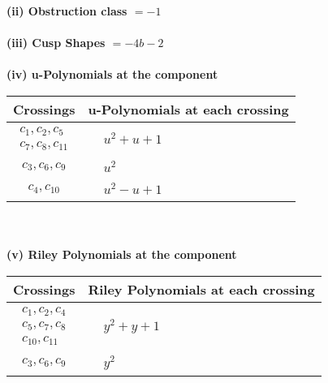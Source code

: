 \documentclass[1p]{elsarticle_modified}
\theoremstyle{definition}
\begin{document}
\flushleft \textbf{(ii) Obstruction class $= -1$}\\~\\
\flushleft \textbf{(iii) Cusp Shapes $= -4 b-2$}\\~\\
\newpage\renewcommand{\arraystretch}{1}
\flushleft \textbf{(iv) u-Polynomials at the component}\newline \\
\begin{tabular}{m{50pt}|m{274pt}}
Crossings & \hspace{64pt}u-Polynomials at each crossing \\
\hline $$\begin{aligned}c_{1},c_{2},c_{5}\\c_{7},c_{8},c_{11}\end{aligned}$$&$\begin{aligned}
&u^2+u+1
\end{aligned}$\\
\hline $$\begin{aligned}c_{3},c_{6},c_{9}\end{aligned}$$&$\begin{aligned}
&u^2
\end{aligned}$\\
\hline $$\begin{aligned}c_{4},c_{10}\end{aligned}$$&$\begin{aligned}
&u^2- u+1
\end{aligned}$\\
\hline
\end{tabular}\\~\\
\newpage\renewcommand{\arraystretch}{1}
\flushleft \textbf{(v) Riley Polynomials at the component}\newline \\
\begin{tabular}{m{50pt}|m{274pt}}
Crossings & \hspace{64pt}Riley Polynomials at each crossing \\
\hline $$\begin{aligned}c_{1},c_{2},c_{4}\\c_{5},c_{7},c_{8}\\c_{10},c_{11}\end{aligned}$$&$\begin{aligned}
&y^2+y+1
\end{aligned}$\\
\hline $$\begin{aligned}c_{3},c_{6},c_{9}\end{aligned}$$&$\begin{aligned}
&y^2
\end{aligned}$\\
\hline
\end{tabular}\\~\\
\end{document}
